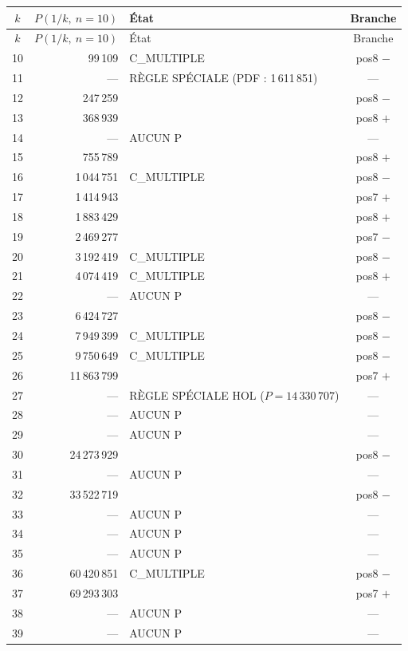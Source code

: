 \documentclass[11pt,a4paper]{article}
\begin{document}
{\small
\begin{longtable}{@{}c r l c@{}}
\toprule
\rowcolor{spectralgris}
$k$ & $P(1/k,\ n=10)$ & État & Branche \\
\midrule
\endfirsthead
\toprule
\rowcolor{spectralgris}
$k$ & $P(1/k,\ n=10)$ & État & Branche \\
\midrule
\endhead
10 & 99\,109 & C\_MULTIPLE & pos8 $-$ \\
11 & --- & RÈGLE SPÉCIALE (PDF : 1\,611\,851) & --- \\
12 & 247\,259 & & pos8 $-$ \\
13 & 368\,939 & & pos8 $+$ \\
14 & --- & AUCUN P & --- \\
15 & 755\,789 & & pos8 $+$ \\
16 & 1\,044\,751 & C\_MULTIPLE & pos8 $-$ \\
17 & 1\,414\,943 & & pos7 $+$ \\
18 & 1\,883\,429 & & pos8 $+$ \\
19 & 2\,469\,277 & & pos7 $-$ \\
20 & 3\,192\,419 & C\_MULTIPLE & pos8 $-$ \\
21 & 4\,074\,419 & C\_MULTIPLE & pos8 $+$ \\
22 & --- & AUCUN P & --- \\
23 & 6\,424\,727 & & pos8 $-$ \\
24 & 7\,949\,399 & C\_MULTIPLE & pos8 $-$ \\
25 & 9\,750\,649 & C\_MULTIPLE & pos8 $-$ \\
26 & 11\,863\,799 & & pos7 $+$ \\
27 & --- & RÈGLE SPÉCIALE HOL ($P = 14\,330\,707$) & --- \\
28 & --- & AUCUN P & --- \\
29 & --- & AUCUN P & --- \\
30 & 24\,273\,929 & & pos8 $-$ \\
31 & --- & AUCUN P & --- \\
32 & 33\,522\,719 & & pos8 $-$ \\
33 & --- & AUCUN P & --- \\
34 & --- & AUCUN P & --- \\
35 & --- & AUCUN P & --- \\
36 & 60\,420\,851 & C\_MULTIPLE & pos8 $-$ \\
37 & 69\,293\,303 & & pos7 $+$ \\
38 & --- & AUCUN P & --- \\
39 & --- & AUCUN P & --- \\

\end{longtable}}
\end{document}

